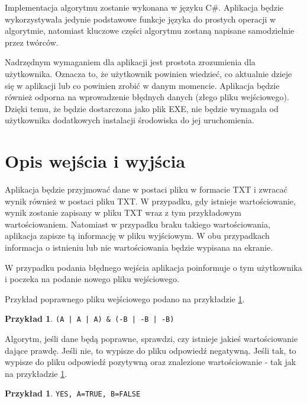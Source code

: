 \documentclass[a4paper,11pt,twoside]{report}
\theoremstyle{definition}
\newtheorem{example}[theorem]{Przykład}
\begin{document}
Implementacja algorytmu zostanie wykonana w języku C\#. Aplikacja będzie wykorzystywała jedynie podstawowe funkcje języka do prostych operacji w algorytmie, natomiast kluczowe części algorytmu zostaną napisane samodzielnie przez twórców.

Nadrzędnym wymaganiem dla aplikacji jest prostota zrozumienia dla użytkownika. Oznacza to, że użytkownik powinien wiedzieć, co aktualnie dzieje się w aplikacji lub co powinien zrobić w danym momencie. Aplikacja będzie również odporna na wprowadzenie błędnych danych (złego pliku wejściowego). Dzięki temu, że będzie dostarczona jako plik EXE, nie będzie wymagała od użytkownika dodatkowych instalacji środowiska do jej uruchomienia.

\section{Opis wejścia i wyjścia}\label{opis_plikow}

Aplikacja będzie przyjmować dane w postaci pliku w formacie TXT i zwracać wynik również w postaci pliku TXT. W przypadku, gdy istnieje wartościowanie, wynik zostanie zapisany w pliku TXT wraz z tym przykładowym wartościowaniem. Natomiast w przypadku braku takiego wartościowania, aplikacja zapisze tą informację w pliku wyjściowym. W obu przypadkach informacja o istnieniu lub nie wartościowania będzie wypisana na ekranie.

W przypadku podania błędnego wejścia aplikacja poinformuje o tym użytkownika i poczeka na podanie nowego pliku wejściowego.

Przykład poprawnego pliku wejściowego podano na przykładzie \ref{exp:przyklad_wejscia}.

\begin{example} \hfill

\centering \verb=(A | A | A) & (-B | -B | -B)=

\label{exp:przyklad_wejscia}
\end{example}

Algorytm, jeśli dane będą poprawne, sprawdzi, czy istnieje jakieś wartościowanie dające prawdę. Jeśli nie, to wypisze do pliku odpowiedź negatywną. Jeśli tak, to wypisze do pliku odpowiedź pozytywną oraz znalezione wartościowanie - tak jak na przykładzie \ref{exp:przyklad_wyjscia}.

\begin{example} \hfill

\centering \verb|YES, A=TRUE, B=FALSE|
\label{exp:przyklad_wyjscia}
\end{example}

\clearpage
\pagestyle{empty}
\printbibliography
\end{document}
